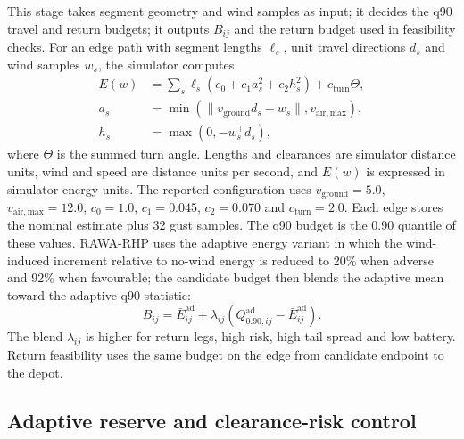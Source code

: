 \documentclass[preprint,12pt]{elsarticle}
\begin{document}
This stage takes segment geometry and wind samples as input; it decides the q90 travel and return budgets; it outputs $B_{ij}$ and the return budget used in feasibility checks. For an edge path with segment lengths $\ell_s$, unit travel directions $d_s$ and wind samples $w_s$, the simulator computes
\begin{equation}
    \begin{aligned}
    E(w)&=\sum_s \ell_s\left(c_0+c_1 a_s^2+c_2 h_s^2\right)+c_{\mathrm{turn}}\Theta,\\
    a_s&=\min(\|v_{\mathrm{ground}}d_s-w_s\|,v_{\mathrm{air,max}}),\\
    h_s&=\max(0,-w_s^\top d_s),
    \end{aligned}
    \label{eq:energy-model}
\end{equation}
where $\Theta$ is the summed turn angle. Lengths and clearances are simulator distance units, wind and speed are distance units per second, and $E(w)$ is expressed in simulator energy units. The reported configuration uses $v_{\mathrm{ground}}=5.0$, $v_{\mathrm{air,max}}=12.0$, $c_0=1.0$, $c_1=0.045$, $c_2=0.070$ and $c_{\mathrm{turn}}=2.0$. Each edge stores the nominal estimate plus 32 gust samples. The q90 budget is the 0.90 quantile of these values. RAWA-RHP uses the adaptive energy variant in which the wind-induced increment relative to no-wind energy is reduced to 20\% when adverse and 92\% when favourable; the candidate budget then blends the adaptive mean toward the adaptive q90 statistic:
\begin{equation}
    B_{ij}=\bar{E}^{\mathrm{ad}}_{ij}+\lambda_{ij}\left(Q^{\mathrm{ad}}_{0.90,ij}-\bar{E}^{\mathrm{ad}}_{ij}\right).
    \label{eq:q90-budget}
\end{equation}
The blend $\lambda_{ij}$ is higher for return legs, high risk, high tail spread and low battery. Return feasibility uses the same budget on the edge from candidate endpoint to the depot.

\subsection{Adaptive reserve and clearance-risk control}
\end{document}
